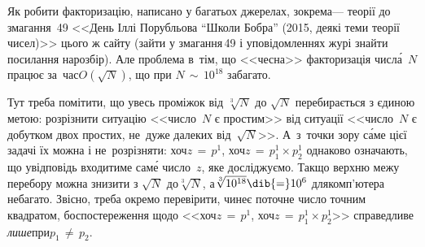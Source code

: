 Як робити факторизацію, написано у багатьох джерелах, зокрема\nolinebreak[3] --- теорії до змагання \textnumero$\,$49 <<День Іллі Порубльова ``Школи Бобра'' (2015, деякі теми теорії чисел)>> цього ж сайту \EjudgeCkipoName{} (зайти у змагання\nolinebreak[3] \textnumero$\,$49 і у\nolinebreak[3] повідомленнях %
журі знайти посилання на\nolinebreak[3] розбір). Але проблема в~тім, що <<чесна>> факторизація числ\'{а}~$N$ працює за~час\nolinebreak[3] $O(\sqrt{N})$, що при ${N\,{\sim}\,10^{18}}$ забагато. 

Тут треба помітити, що увесь проміжок від $\sqrt[3]{N}$ до $\sqrt{N}$ перебирається з єдиною метою: розрізнити ситуацію <<число~$N$ є простим>> від ситуації <<число~$N$ є добутком двох простих, не~дуже далеких від~$\sqrt{N}$>>. А~з~точки зору с\'{а}ме цієї задачі їх можна і не~розрізняти: хоч\nolinebreak[3] ${z\,{=}\,p^1}$, хоч\nolinebreak[3] ${z\,{=}\,p_1^1{\times}p_2^1}$ однаково означають, що у\nolinebreak[3] відповідь входитиме сам\'{е} число~$z$, яке досліджуємо. Так\nolinebreak[3] що верхню межу перебору можна знизити з $\sqrt{N}$ до\nolinebreak[3] $\sqrt[3]{N}$, а\nolinebreak[3] $\sqrt[3]{10^{18}}\dib{{=}}10^6$ для\nolinebreak[2] комп'ютера небагато. Звісно, %
треба окремо перевірити, чи\nolinebreak[2] не\nolinebreak[3] є поточне число точним квадратом, бо\nolinebreak[3] спостереження щодо <<хоч\nolinebreak[3] ${z\,{=}\,p^1}$, хоч\nolinebreak[3] ${z\,{=}\,p_1^1{\times}p_2^1}$>> справедливе \emph{лише}\nolinebreak[3] при\nolinebreak[3] ${p_1\,{\neq}\,p_2}$.
